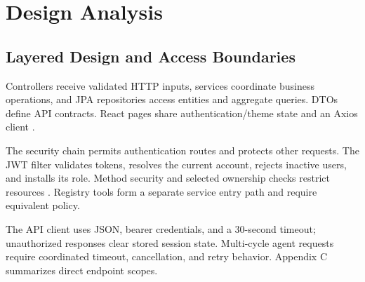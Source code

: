 \chapter{Design Analysis}
\section{Layered Design and Access Boundaries}
Controllers receive validated HTTP inputs, services coordinate business operations, and JPA repositories access entities and aggregate queries. DTOs define API contracts. React pages share authentication/theme state and an Axios client \cite{repo}.

The security chain permits authentication routes and protects other requests. The JWT filter validates tokens, resolves the current account, rejects inactive users, and installs its role. Method security and selected ownership checks restrict resources \cite{spring}. Registry tools form a separate service entry path and require equivalent policy.

The API client uses JSON, bearer credentials, and a 30-second timeout; unauthorized responses clear stored session state. Multi-cycle agent requests require coordinated timeout, cancellation, and retry behavior. Appendix C summarizes direct endpoint scopes.


